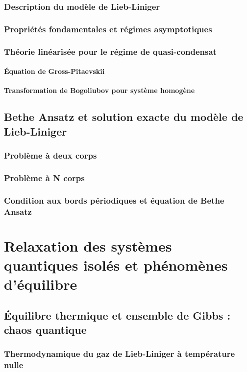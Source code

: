 \section{Description du modèle de Lieb-Liniger}
\section{Propriétés fondamentales et régimes asymptotiques}
\section{Théorie linéarisée pour le régime de quasi-condensat}
\subsection{Équation de Gross-Pitaevskii}
\subsection{Transformation de Bogoliubov pour système homogène}

\chapter{Bethe Ansatz et solution exacte du modèle de Lieb-Liniger}
\minitoc
\section{Problème à deux corps}
\section{Problème à N corps}
\section{Condition aux bords périodiques et équation de Bethe Ansatz}

\part{Relaxation des systèmes quantiques isolés et phénomènes d'équilibre}

\chapter{Équilibre thermique et ensemble de Gibbs : chaos quantique}
\minitoc
\section{Thermodynamique du gaz de Lieb-Liniger à température nulle}
